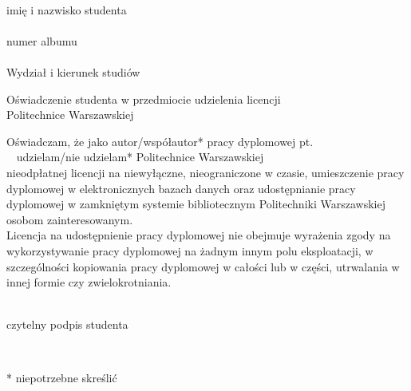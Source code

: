 \documentclass[10pt,twoside,a4paper]{article}
\begin{document}
	\vspace{5pt}
	\begin{flushleft}
		\begin{minipage}{0.33\linewidth}
			\begin{flushleft}
				\dotfill \\ \vspace{-5pt}
				imię i nazwisko studenta \\
				\vspace{10pt}
				\dotfill \\  \vspace{-5pt}
				numer albumu \\
				\vspace{10pt}
				\dotfill \\  \vspace{-5pt}
				Wydział i kierunek studiów
			\end{flushleft}
		\end{minipage}
	\end{flushleft}
	\vspace{15 pt}
	\begin{center}
		Oświadczenie studenta w przedmiocie udzielenia licencji \\		
		Politechnice Warszawskiej
	\end{center}
	Oświadczam, że jako autor/współautor* pracy dyplomowej pt. \dotfill \\ $\phantom{x}$ \hspace{-15pt} \dotfill udzielam/nie udzielam* Politechnice Warszawskiej \\ nieodpłatnej licencji na niewyłączne, nieograniczone w czasie, umieszczenie pracy dyplomowej w elektronicznych bazach danych oraz udostępnianie pracy dyplomowej w zamkniętym systemie bibliotecznym Politechniki Warszawskiej osobom zainteresowanym. \\	
	
	Licencja na udostępnienie pracy dyplomowej nie obejmuje wyrażenia zgody na wykorzystywanie pracy dyplomowej na żadnym innym polu eksploatacji, w szczególności kopiowania pracy dyplomowej w całości lub w części, utrwalania w innej formie czy zwielokrotniania.
	\vspace{40pt}
	\begin{flushright}
		\begin{minipage}{0.33\linewidth}
			\begin{center}
				\dotfill  \\ \vspace{-5pt}
				czytelny podpis studenta
			\end{center}
		\end{minipage}
		\begin{minipage}{0.025\linewidth}
			$\phantom{0}$
		\end{minipage}
	\end{flushright}
	\vfill
	\begin{flushleft}
		{\fontsize{10}{12}* niepotrzebne skreślić}
	\end{flushleft}
	
\end{document}

